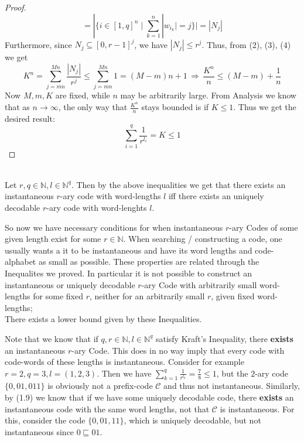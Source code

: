 \documentclass[12pt]{article}
\newenvironment{statement2}[2]{\begin{trivlist}
\item[\hskip \labelsep {\bfseries #1}\hskip \labelsep {\bfseries #2}]}{\end{trivlist}}
\newenvironment{statement3}[3]{\begin{trivlist}
\item[\hskip \labelsep {\bfseries #1}\hskip \labelsep {\bfseries #2} {#3}\textbf{.}]}{\end{trivlist}}
\begin{document}
\begin{statement3}{(1.8)}{Theorem}{(McMillan's Inequality)}
\begin{proof}
\begin{equation}
            = |\{i \in [1,q]^n \mid \sum_{k=1}^{n} |w_{i_k}| = j\}| \tag{4}
            = |N_{j}|
        \end{equation}
        Furthermore, since $N_{j} \subseteq [0,r-1]^j$, we have $|N_{j}| \leq r^j$. Thus, from (2), (3), (4) we get
        $$
            K^n = \sum_{j = mn}^{Mn} \frac{|N_{j}|}{r^j} \leq \sum_{j = mn}^{Mn} 1 = (M-m)n + 1
            \,\Longrightarrow\, \frac{K^n}{n} \leq (M-m) + \frac{1}{n}
        $$
        Now $M,m,K$ are fixed, while $n$ may be arbitrarily large. From Analysis we know
        that as $n \to \infty$, the only way that $\frac{K^n}{n}$ stays bounded is if $K \leq 1$.
        Thus we get the desired result:
        $$
            \sum_{i=1}^{q} \frac{1}{r^{l_i}} = K \leq 1
        $$
    \end{proof}
\end{statement3}

\begin{statement2}{(1.9)}{Corollary.}\strut\\[2pt]
    Let $r,q \in \mathbb{N}, l \in \mathbb{N}^q$. Then by the above inequalities we get
    that there exists an instantaneous $r$-ary code with word-lengths $l$ iff
    there exists an uniquely decodable $r$-ary code with word-lenghts $l$.
\end{statement2}

So now we have necessary conditions for when instantaneous $r$-ary Codes of some
given length exist for some $r \in \mathbb{N}$.
When searching / constructing a code, one usually wants a it to be instantaneous and have
its word lengths and code-alphabet as small as possible.
These properties are related through the Inequalites we proved.
In particular it is not possible to construct an instantaneous or uniquely decodable $r$-ary Code
with arbitrarily small word-lengths for some fixed $r$, neither for an arbitrarily small
$r$, given fixed word-lengths;\\
There exists a lower bound given by these Inequalities.

\begin{statement2}{(1.10)}{Remark.}
    Note that we know that if $q,r \in \mathbb{N}, l \in \mathbb{N}^q$
    satisfy Kraft's Inequality, there \textbf{exists} an instantaneous $r$-ary Code. This does in no way imply
    that every code with code-words of these lengths is instantaneous. Consider for example
    $r = 2, q = 3, l = (1,2,3)$. Then we have $\sum_{k=1}^{q} \frac{1}{r^{l_k}} = \frac{7}{8} \leq 1$,
    but the $2$-ary code $\{0, 01, 011\}$ is obviously not a prefix-code $\mathcal{C}$ and thus not instantaneous.
    Similarly, by (1.9) we know that if we have some uniquely decodable code, there \textbf{exists} an
    instantaneous code with the same word lengths, not that $\mathcal{C}$ is instantaneous. For this,
    consider the code $\{0,01,11\}$, which is uniquely decodable, but not instantaneous since $0 \sqsubseteq 01$.
\end{statement2}
\end{document}
